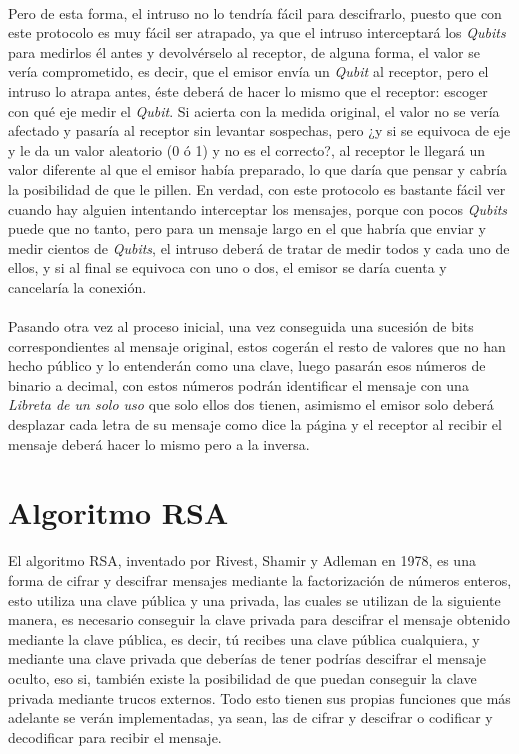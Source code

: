 \documentclass[12pt,a4paper]{book}
\theoremstyle{change}
\begin{document}
	\vspace{5mm}\\
	Pero de esta forma, el intruso no lo tendría fácil para descifrarlo, puesto que con este protocolo es muy fácil ser atrapado, ya que el intruso interceptará los \textit{Qubits} para medirlos él antes y devolvérselo al receptor, de alguna forma, el valor se vería comprometido, es decir, que el emisor envía un \textit{Qubit} al receptor, pero el intruso lo atrapa antes, éste deberá de hacer lo mismo que el receptor: escoger con qué eje medir el \textit{Qubit}. Si acierta con la medida original, el valor no se vería afectado y pasaría al receptor sin levantar sospechas, pero ¿y si se equivoca de eje y le da un valor aleatorio (0 ó 1) y no es el correcto?, al receptor le llegará un valor diferente al que el emisor había preparado, lo que daría que pensar y cabría la posibilidad de que le pillen. En verdad, con este protocolo es bastante fácil ver cuando hay alguien intentando interceptar los mensajes, porque con pocos \textit{Qubits} puede que no tanto, pero para un mensaje largo en el que habría que enviar y medir cientos de \textit{Qubits}, el intruso deberá de tratar de medir todos y cada uno de ellos, y si al final se equivoca con uno o dos, el emisor se daría cuenta y cancelaría la conexión.\\
	\vspace{5mm}\\
	Pasando otra vez al proceso inicial, una vez conseguida una sucesión de bits correspondientes al mensaje original, estos cogerán el resto de valores que no han hecho público y lo entenderán como una clave, luego pasarán esos números de binario a decimal, con estos números podrán identificar el mensaje con una \textit{Libreta de un solo uso} que solo ellos dos tienen, asimismo el emisor solo deberá desplazar cada letra de su mensaje como dice la página y el receptor al recibir el mensaje deberá hacer lo mismo pero a la inversa.
	
	
	
	\section{Algoritmo RSA} %
	El algoritmo RSA, inventado por Rivest, Shamir y Adleman en 1978, es una forma de cifrar y descifrar mensajes mediante la factorización de números enteros, esto utiliza una clave pública y una privada, las cuales se utilizan de la siguiente manera, es necesario conseguir la clave privada para descifrar el mensaje obtenido mediante la clave pública, es decir, tú recibes una clave pública cualquiera, y mediante una clave privada que deberías de tener podrías descifrar el mensaje oculto, eso si, también existe la posibilidad de que puedan conseguir la clave privada mediante trucos externos. Todo esto tienen sus propias funciones que más adelante se verán implementadas, ya sean, las de cifrar y descifrar o codificar y decodificar para recibir el mensaje.
	
\end{document}
